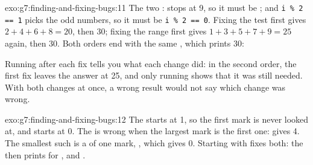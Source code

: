 \begin{solution}{exo:g7:finding-and-fixing-bugs:11}
The two :  stops at 9, so it must be
; and \texttt{i \% 2 == 1} picks the odd numbers, so it
must be \texttt{i \% 2 == 0}. Fixing the test first gives $2 + 4 + 6 + 8 = 20$,
then 30; fixing the range first gives $1 + 3 + 5 + 7 + 9 = 25$ again, then 30.
Both orders end with the same , which prints 30:

\label{lst:g7:finding-and-fixing-bugs:sol-evens}

Running after each fix tells you what each change did: in the second order,
the first fix leaves the answer at 25, and only running shows that it was
still needed. With both changes at once, a wrong result would not say which
change was wrong.
\end{solution}

\begin{solution}{exo:g7:finding-and-fixing-bugs:12}
The  starts at  1, so the first mark is never looked at, and
 starts at 0. The  is wrong when the largest mark is the
first one: \code{[9, 3, 4]} gives 4. The smallest such  is a  of one
mark, \code{[5]}, which gives 0. Starting with  fixes
both: the  then prints  for \code{[3, 9, 4]}, \code{[9, 3,
4]} and \code{[5]}.
\end{solution}

